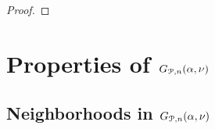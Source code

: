 \begin{appendices}
\begin{proof}

\end{proof}


\section{Properties of $G_{{\mathcal P},n}(\alpha,\nu)$}

\subsection{Neighborhoods in $G_{{\mathcal P},n}(\alpha,\nu)$}


\end{appendices}
